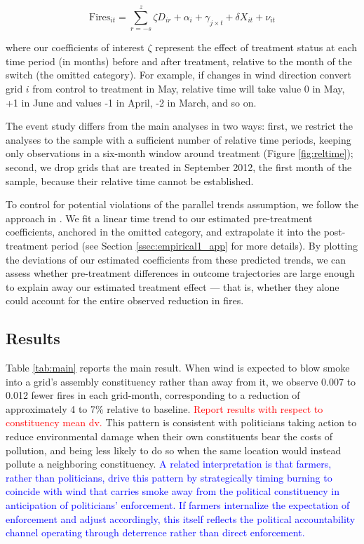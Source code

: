 \documentclass[12pt]{article}
\begin{document}
\begin{equation}\label{eq2}
 \text{Fires}_{it} = \sum_{r=-s}^{z} \zeta D_{ir} + \alpha_{i}+ \gamma_{j \times t} + \delta X_{it} + \nu_{i t}
\end{equation}

where our coefficients of interest $\zeta$ represent the effect of treatment status at each time period (in months) before and after treatment, relative to the month of the switch (the omitted category). For example, if changes in wind direction convert grid $i$ from control to treatment in May, relative time will take value 0 in May, +1 in June and values -1 in April, -2 in March, and so on.  

The event study differs from the main analyses in two ways: first, we restrict the analyses to the sample with a sufficient number of relative time periods, keeping only observations in a six-month window around treatment (Figure \ref{fig:reltime});  second, we drop grids that are treated in September 2012, the first month of the sample, because their relative time cannot be established.

To control for potential violations of the parallel trends assumption, we follow the approach in \cite{dustmann2022reallocation}. We fit a linear time trend to our estimated pre-treatment coefficients, anchored in the omitted category, and extrapolate it into the post-treatment period (see Section \ref{ssec:empirical1_app} for more details). By plotting the deviations of our estimated coefficients from these predicted trends, we can assess whether pre-treatment differences in outcome trajectories are large enough to explain away our estimated treatment effect — that is, whether they alone could account for the entire observed reduction in fires. 

\subsection{Results\label{ssec:results1}}


Table \ref{tab:main} reports the main result. When wind is expected to blow smoke into a grid's assembly constituency rather than away from it, we observe 0.007 to 0.012 fewer fires in each grid-month, corresponding to a reduction of approximately 4 to 7\% relative to baseline. \textcolor{red}{Report results with respect to constituency mean dv.} This pattern is consistent with politicians taking action to reduce environmental damage when their own constituents bear the costs of pollution, and being less likely to do so when the same location would instead pollute a neighboring constituency.
\textcolor{blue}{A related interpretation is that farmers, rather than politicians, drive this pattern by strategically timing burning to coincide with wind that carries smoke away from the political constituency in anticipation of politicians' enforcement. If farmers internalize the expectation of enforcement and adjust accordingly, this itself reflects the political accountability channel operating through deterrence rather than direct enforcement.}
\end{document}
